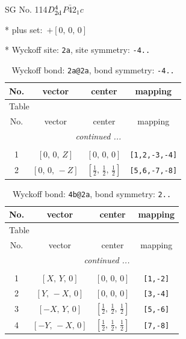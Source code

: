 \documentclass[fleqn,8pt]{jsarticle}
\begin{document}
\setcounter{MaxMatrixCols}{32}

\renewcommand{\tablename}{Table~}
\renewcommand{\figurename}{Figure~}
\begin{center}
\LARGE
SG No. 114\quad$D_{\rm 2d}^{4}$\quad$P\bar{4}2_1c$\quad[ tetragonal ]
\end{center}

* plus set:\,\,\,$+\left[ 0,\, 0,\, 0 \right]$


* Wyckoff site: {\tt 2a}, site symmetry: {\tt -4..}
\renewcommand{\arraystretch}{1.2}
\begin{longtable}{cccc}
\caption{Wyckoff bond: {\tt 2a@2a}, bond symmetry: {\tt -4..}}
 \\
 \hline \hline
No. & vector & center & mapping \\ \hline \endfirsthead

\multicolumn{3}{l}{\tablename\ \thetable{}} \\
 \hline \hline
No. & vector & center & mapping \\ \hline \endhead

 \hline \hline
\multicolumn{3}{r}{\footnotesize\it continued ...} \\ \endfoot

 \hline \hline
\multicolumn{3}{r}{} \\ \endlastfoot

1 & $\left[ 0,\, 0,\, Z \right]$ & $\left[ 0,\, 0,\, 0 \right]$ & {\tt [1,2,-3,-4]} \\ \hline
2 & $\left[ 0,\, 0,\, - Z \right]$ & $\left[ \frac{1}{2},\, \frac{1}{2},\, \frac{1}{2} \right]$ & {\tt [5,6,-7,-8]} \\
\end{longtable}
\renewcommand{\arraystretch}{1.2}
\begin{longtable}{cccc}
\caption{Wyckoff bond: {\tt 4b@2a}, bond symmetry: {\tt 2..}}
 \\
 \hline \hline
No. & vector & center & mapping \\ \hline \endfirsthead

\multicolumn{3}{l}{\tablename\ \thetable{}} \\
 \hline \hline
No. & vector & center & mapping \\ \hline \endhead

 \hline \hline
\multicolumn{3}{r}{\footnotesize\it continued ...} \\ \endfoot

 \hline \hline
\multicolumn{3}{r}{} \\ \endlastfoot

1 & $\left[ X,\, Y,\, 0 \right]$ & $\left[ 0,\, 0,\, 0 \right]$ & {\tt [1,-2]} \\ \hline
2 & $\left[ Y,\, - X,\, 0 \right]$ & $\left[ 0,\, 0,\, 0 \right]$ & {\tt [3,-4]} \\ \hline
3 & $\left[ - X,\, Y,\, 0 \right]$ & $\left[ \frac{1}{2},\, \frac{1}{2},\, \frac{1}{2} \right]$ & {\tt [5,-6]} \\ \hline
4 & $\left[ - Y,\, - X,\, 0 \right]$ & $\left[ \frac{1}{2},\, \frac{1}{2},\, \frac{1}{2} \right]$ & {\tt [7,-8]} \\
\end{longtable}
\end{document}
